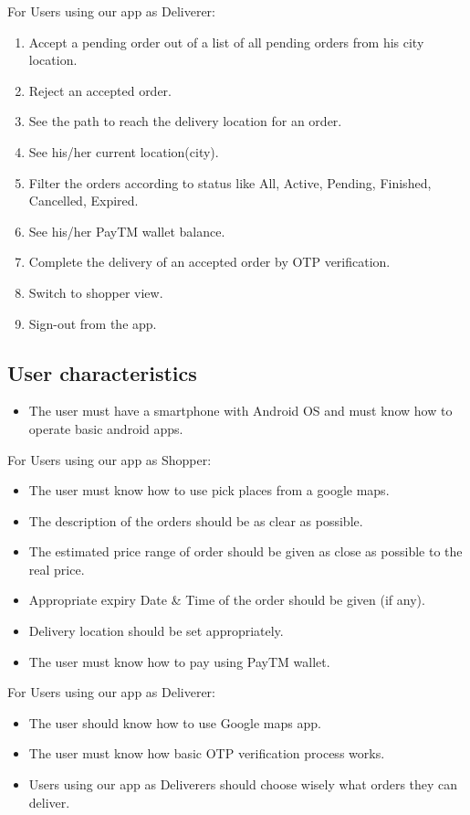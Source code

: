 \documentclass{report}
\begin{document}
For Users using our app as Deliverer:
\begin{enumerate}[label=\alph*)]
\item Accept a pending order out of a list of all pending orders from his city location.
\item Reject an accepted order.
\item See the path to reach the delivery location for an order.
\item See his/her current location(city).
\item Filter the orders according to status like All, Active, Pending, Finished, Cancelled, Expired.
\item See his/her PayTM wallet balance.
\item Complete the delivery of an accepted order by OTP verification. 
\item Switch to shopper view.
\item Sign-out from the app.
\end{enumerate}

\subsection{User characteristics}
\begin{itemize}
\item The user must have a smartphone with Android OS and must know how to operate basic android apps.
\end{itemize}

For Users using our app as Shopper:
\begin{itemize}
\item The user must know how to use pick places from a google maps.
\item The description of the orders should be as clear as possible.
\item The estimated price range of order should be given as close as possible to the real price.
\item Appropriate expiry Date \& Time of the order should be given (if any).
\item Delivery location should be set appropriately. 
\item The user must know how to pay using PayTM wallet.
\end{itemize}

For Users using our app as Deliverer:
\begin{itemize}
\item The user should know how to use Google maps app.
\item The user must know how basic OTP verification process works.
\item Users using our app as Deliverers should choose wisely what orders they can deliver.
\end{itemize}
\end{document}
